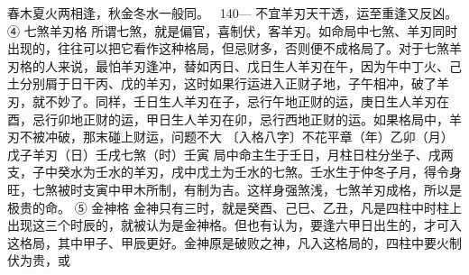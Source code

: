 春木夏火两相逢，秋金冬水一般同。
~140—
不宜羊刃天干透，运至重逢又反凶。
④	七煞羊刃格
所谓七煞，就是偏官，喜制伏，客羊刃。如命局中七煞、羊刃同时出现的，往往可以把它看作这种格局，但忌财多，否则便不成格局了。对于七煞羊刃格的人来说，最怕羊刃逢冲，替如丙日、戊日生人羊刃在午，因为午中丁火、己土分别屑于日干丙、戊的羊刃，这时如果行运进入正财子地，子午相冲，破了羊刃，就不妙了。同样，壬日生人羊刃在子，忌行午地正财的运，庚日生人羊刃在酉，忌行卯地正财的运，甲日生人羊刃在卯，忌行西地正财的运。如果格局中，羊刃不被冲破，那末碰上财运，问题不大
〔入格八字〕不花平章（年）乙卯（月）戊子羊刃（日）壬戌七煞（时）壬寅
局中命主生于壬日，月柱日柱分坐子、戌两支，子中癸水为壬水的羊刃，戌中戊土为壬水的七煞。壬水生于仲冬子月，得令身旺，七煞被时支寅中甲木所制，有制为吉。这样身强煞浅，七煞羊刃成格，所以是极贵的命。
⑤	金神格
金神只有三时，就是癸酉、己巳、乙丑，凡是四柱中时柱上出现这三个时辰的，就被认为是金神格。但也有认为，要逢六甲日出生的，才可入这格局，其中甲子、甲辰更好。金神原是破败之神，凡入这格局的，四柱中要火制伏为贵，或


